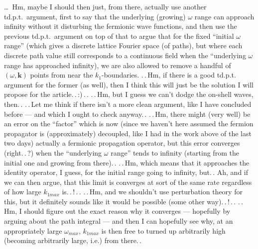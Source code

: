 \documentclass{report}
\begin{document}
\ldots\ Hm, maybe I should then just, from there, actually use another td.p.t.\ argument, first to say that the underlying (growing) $\omega$ range can approach infinity without it disturbing the fermionic wave functions, and then use the previous td.p.t.\ argument on top of that to argue that for the fixed ``initial $\omega$ range'' (which gives a discrete lattice Fourier space (of paths), but where each discrete path value still corresponds to a continuous field when the ``underlying $\omega$ range has approached infinity), we are also allowed to remove a handful of $(\omega, \boldsymbol{k})$ points from near the $k_1$-boundaries. .\,.\,Hm, if there is a good td.p.t. argument for the former (as well), then I think this will just be the solution I will propose for the article.\,.\,:)\,.\,. .\,.\,Hm, but I guess we can't dodge the on-shell waves, then.\,. .\,.\,Let me think if there isn't a more clean argument, like I have concluded before --- and which I ought to check anyway.\,. %
.\,.\,Hm, there might (very well) be an error on the ``factor'' which is now (since we haven't here assumed the fermion propagator is (approximately) decoupled, like I had in the work above of the last two days) actually a fermionic propagation operator, but this error converges (right.\,.\,?) when the ``underlying $\omega$ range'' tends to infinity (starting from the initial one and growing from there).\,. .\,.\,Hm, which means that it approaches the identity operator, I guess, for the initial range going to infinity, but.\,. Ah, and if we can then argue, that this limit is converges at sort of the same rate regardless of how large $k_{1 max}$ is.\,.\,!\,.\,. %
.\,.\,Hm, and we shouldn't use perturbation theory for this, but it definitely sounds like it would be possible (some other way).\,.\,!\,.\,. 
.\,.\,Hm, I should figure out the exact reason why it converges --- hopefully by arguing about the path integral --- and then I can hopefully see why, at an appropriately large $\omega_{max}$, $k_{1 max}$ is then free to turned up arbitrarily high (becoming arbitrarily large, i.e.) from there.\,. %
\end{document}
